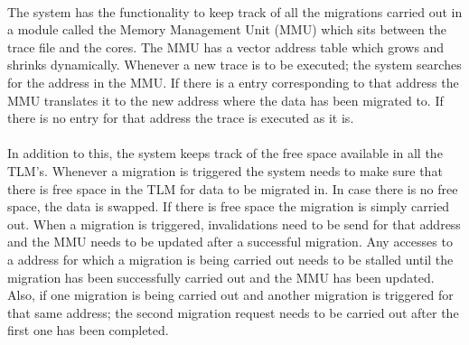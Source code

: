 \documentclass{listhesis}
\begin{document}
\\
The system has the functionality to keep track of all the migrations carried out in a module called the Memory Management Unit (MMU) which sits between the trace file and the cores. The MMU has a vector address table which grows and shrinks dynamically. Whenever a new trace is to be executed; the system searches for the address in the MMU. If there is a entry corresponding to that address the MMU translates it to the new address where the data has been migrated to. If there is no entry for that address the trace is executed as it is. \\
\\
In addition to this, the system keeps track of the free space available in all the TLM's. Whenever a migration is triggered the system needs to make sure that there is free space in the TLM for data to be migrated in. In case there is no free space, the data is swapped. If there is free space the migration is simply carried out. When a migration is triggered, invalidations need to be send for that address and the MMU needs to be updated after a successful migration. Any accesses to a address for which a migration is being carried out needs to be stalled until the migration has been successfully carried out and the MMU has been updated. Also, if one migration is being carried out and another migration is triggered for that same address; the second migration request needs to be carried out after the first one has been completed. \\
\end{document}
